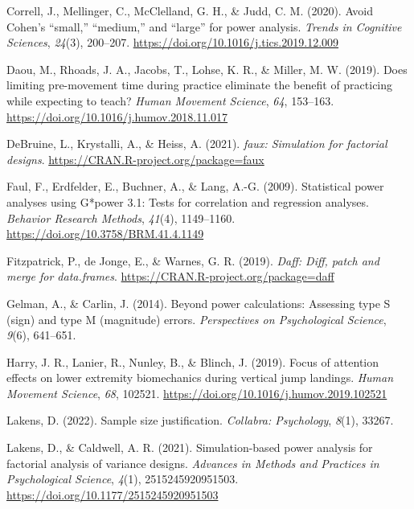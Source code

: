 \documentclass[
  man, donotrepeattitle,mask,floatsintext]{apa7}
\newlength{\cslhangindent}
\newlength{\cslentryspacingunit} %
\newenvironment{CSLReferences}[2] %
 {%
  \setlength{\parindent}{0pt}
  \ifodd #1
  \let\oldpar\par
  \def\par{\hangindent=\cslhangindent\oldpar}
  \fi
  \setlength{\parskip}{#2\cslentryspacingunit}
 }%
 {}
\begin{document}
\begin{CSLReferences}{1}{0}
\leavevmode{}%
Correll, J., Mellinger, C., McClelland, G. H., \& Judd, C. M. (2020). Avoid {Cohen}'s {``small,''} {``medium,''} and {``large''} for power analysis. \emph{Trends in Cognitive Sciences}, \emph{24}(3), 200--207. \url{https://doi.org/10.1016/j.tics.2019.12.009}

\leavevmode{}%
Daou, M., Rhoads, J. A., Jacobs, T., Lohse, K. R., \& Miller, M. W. (2019). Does limiting pre-movement time during practice eliminate the benefit of practicing while expecting to teach? \emph{Human Movement Science}, \emph{64}, 153--163. \url{https://doi.org/10.1016/j.humov.2018.11.017}

\leavevmode{}%
DeBruine, L., Krystalli, A., \& Heiss, A. (2021). \emph{{faux}: Simulation for factorial designs}. \url{https://CRAN.R-project.org/package=faux}

\leavevmode{}%
Faul, F., Erdfelder, E., Buchner, A., \& Lang, A.-G. (2009). Statistical power analyses using {G}*power 3.1: Tests for correlation and regression analyses. \emph{Behavior Research Methods}, \emph{41}(4), 1149--1160. \url{https://doi.org/10.3758/BRM.41.4.1149}

\leavevmode{}%
Fitzpatrick, P., de Jonge, E., \& Warnes, G. R. (2019). \emph{Daff: Diff, patch and merge for data.frames}. \url{https://CRAN.R-project.org/package=daff}

\leavevmode{}%
Gelman, A., \& Carlin, J. (2014). Beyond power calculations: Assessing type {S} (sign) and type {M} (magnitude) errors. \emph{Perspectives on Psychological Science}, \emph{9}(6), 641--651.

\leavevmode{}%
Harry, J. R., Lanier, R., Nunley, B., \& Blinch, J. (2019). Focus of attention effects on lower extremity biomechanics during vertical jump landings. \emph{Human Movement Science}, \emph{68}, 102521. \url{https://doi.org/10.1016/j.humov.2019.102521}

\leavevmode{}%
Lakens, D. (2022). Sample size justification. \emph{Collabra: Psychology}, \emph{8}(1), 33267.

\leavevmode{}%
Lakens, D., \& Caldwell, A. R. (2021). Simulation-based power analysis for factorial analysis of variance designs. \emph{Advances in Methods and Practices in Psychological Science}, \emph{4}(1), 2515245920951503. \url{https://doi.org/10.1177/2515245920951503}


\end{CSLReferences}
\end{document}
